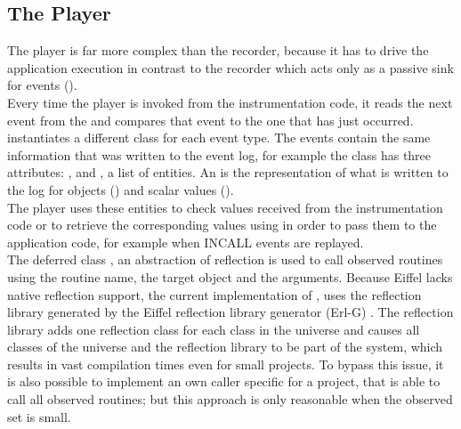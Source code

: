 \subsection{The Player}
The player is far more complex than the recorder, because it has to drive the application execution in contrast to the recorder which acts only as a passive sink for events (). \\
Every time the player is invoked from the instrumentation code, it reads the next event from the  and compares that event to the one that has just occurred.  instantiates a different class for each event type. The events contain the same information that was written to the event log, for example the class  has three attributes: ,  and , a list of entities. An  is the representation of what is written to the log for objects () and scalar values ().\\
The player uses these entities to check values received from the instrumentation code or to retrieve the corresponding values using  in order to pass them to the application code, for example when INCALL events are replayed.\\
The deferred class , an abstraction of reflection is used to call observed routines using the routine name, the target object and the arguments. Because Eiffel lacks native reflection support, the current implementation of ,  uses the reflection library generated by the Eiffel reflection library generator (Erl-G) \cite{erlg}. The reflection library adds one reflection class for each class in the universe and causes all classes of the universe and the reflection library to be part of the system, which results in vast compilation times even for small projects. To bypass this issue, it is also possible to implement an own caller specific for a project, that is able to call all observed routines; but this approach is only reasonable when the observed set is small.

